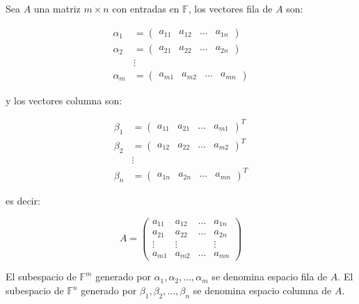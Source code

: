 		\begin{definicion}
			Sea $A$ una matriz $m \times n$ con entradas en $\mathbb{F}$, los vectores fila de $A$ son:

			\begin{align*}
				\alpha_1 &= \begin{pmatrix} a_{11} & a_{12} & \dots & a_{1n} \end{pmatrix} \\
				\alpha_2 &= \begin{pmatrix} a_{21} & a_{22} & \dots & a_{2n} \end{pmatrix} \\
				&\vdots \\
				\alpha_m &= \begin{pmatrix} a_{m1} & a_{m2} & \dots & a_{mn} \end{pmatrix}
			\end{align*}

			y los vectores columna son:

			\begin{align*}
				\beta_1 &= \begin{pmatrix} a_{11} & a_{21} & \dots & a_{m1} \end{pmatrix}^T \\
				\beta_2 &= \begin{pmatrix} a_{12} & a_{22} & \dots & a_{m2} \end{pmatrix}^T \\
				&\vdots \\
				\beta_n &= \begin{pmatrix} a_{1n} & a_{2n} & \dots & a_{mn} \end{pmatrix}^T
			\end{align*}

			es decir:

			\begin{equation*}
				A =
				\begin{pmatrix}
					a_{11} & a_{12} & \dots & a_{1n} \\
					a_{21} & a_{22} & \dots & a_{2n} \\
					\vdots & \vdots & & \vdots \\
					a_{m1} & a_{m2} & \dots & a_{mn}
				\end{pmatrix}
			\end{equation*}

			El subespacio de $\mathbb{F}^m$ generado por $\alpha_1, \alpha_2, \dots, \alpha_m$ se denomina espacio fila de $A$.
			El subespacio de $\mathbb{F}^n$ generado por $\beta_1, \beta_2, \dots, \beta_n$ se denomina espacio columna de $A$.
		\end{definicion}

